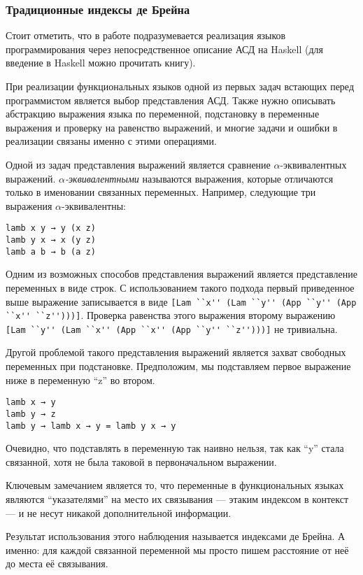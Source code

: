 \subsubsection{Традиционные индексы де Брейна}\label{de_brujin}
Стоит отметить, что в работе подразумевается реализация языков программирования через непосредственное описание АСД на Haskell (для введение в Haskell можно прочитать книгу\cite{moronuki}).

При реализации функциональных языков одной из первых задач встающих перед программистом является выбор представления АСД. Также нужно описывать абстракцию выражения языка по переменной, подстановку в переменные выражения и проверку на равенство выражений, и многие задачи и ошибки в реализации связаны именно с этими операциями.

Одной из задач представления выражений является сравнение $\alpha$-эквивалентных выражений. \textit{$\alpha$-эквивалентными} называются выражения, которые отличаются только в именовании связанных переменных. Например, следующие три выражения $\alpha$-эквивалентны:

\begin{lstlisting}
lamb x y → y (x z)
lamb y x → x (y z)
lamb a b → b (a z)
\end{lstlisting}

Одним из возможных способов представления выражений является представление переменных в виде строк. С использованием такого подхода первый приведенное выше выражение записывается в виде \lstinline{[Lam ``x'' (Lam ``y'' (App ``y'' (App ``x'' ``z'')))]}. Проверка равенства этого выражения второму выражению \lstinline{[Lam ``y'' (Lam ``x'' (App ``x'' (App ``y'' ``z'')))]} не тривиальна.

Другой проблемой такого представления выражений является захват свободных переменных при подстановке. Предположим, мы подставляем первое выражение ниже в переменную ``z'' во втором.
\begin{lstlisting}
lamb x → y
lamb y → z
lamb y → lamb x → y = lamb y x → y
\end{lstlisting}

Очевидно, что подставлять в переменную так наивно нельзя, так как ``y'' стала связанной, хотя не была таковой в первоначальном выражении.

Ключевым замечанием является то, что переменные в функциональных языках являются ``указателями'' на место их связывания --- этаким индексом в контекст --- и не несут никакой дополнительной информации.

Результат использования этого наблюдения называется индексами де Брейна. А именно: для каждой связанной переменной мы просто пишем расстояние от неё до места её связывания.

